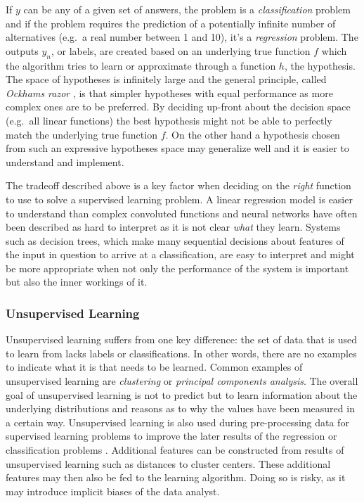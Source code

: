 If $y$ can be any of a given set of answers, the problem is a \emph{classification} problem and if the problem requires the
prediction of a potentially infinite number of alternatives (e.g.\ a real number between 1 and 10), it's a
\emph{regression} problem. The outputs $y_n$, or labels, are created based on an underlying true function $f$ which the
algorithm tries to learn or approximate through a function $h$, the hypothesis. The space of hypotheses is infinitely
large and the general principle, called \emph{Ockhams razor} , is that simpler hypotheses with equal performance as more complex
ones are to be preferred. By deciding up-front about the decision space (e.g.\ all linear functions) the best hypothesis
might not be able to perfectly match the underlying true function $f$. On the other hand a hypothesis chosen from such
an expressive hypotheses space may generalize well and it is easier to understand and implement.

The tradeoff described above is a key factor when deciding on the \emph{right} function to use to solve a supervised
learning problem. A linear regression model is easier to understand than complex convoluted functions and neural
networks have
often been described as hard to interpret as it is not clear \emph{what} they learn. Systems such as decision trees,
which make many sequential decisions about features of the input in question to arrive at a classification, are easy to
interpret and might be more appropriate when not only the performance of the system is important but also the
inner workings of it.


\subsubsection{Unsupervised Learning}
Unsupervised learning suffers from one key difference: the set of data that is used to learn from lacks labels or
classifications. In other words, there are no examples to indicate what it is that needs to be
learned. Common examples of unsupervised learning are \emph{clustering} or \emph{principal components analysis}. The
overall goal of unsupervised learning is not to predict but to learn information about the underlying distributions and
reasons as to why the values have been measured in a certain way. Unsupervised learning is also used during pre-processing
data for supervised learning problems to improve the later results of the regression or classification problems
\cite[p.373f.]{james2013introduction}.
Additional features can be constructed from results of unsupervised learning such as distances to cluster centers. These
additional features may then also be fed to the learning algorithm. Doing so is risky, as it may introduce
implicit biases of the data analyst.

